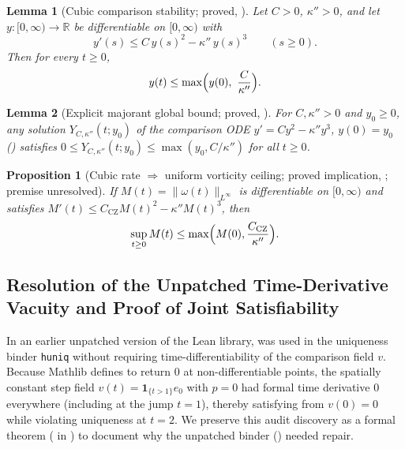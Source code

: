 \documentclass[11pt,a4paper]{article}
\theoremstyle{plain}
\newtheorem{proposition}{Proposition}[section]
\newtheorem{lemma}{Lemma}[section]
\theoremstyle{definition}
\theoremstyle{remark}
\newcommand{\R}{\mathbb{R}}
\newcommand{\CZ}{C_{\mathrm{CZ}}}
\begin{document}
\begin{lemma}[Cubic comparison stability; proved, ]\label{lem:cubic}
Let $C>0$, $\kappa''>0$, and let $y:[0,\infty)\to\R$ be differentiable on $[0,\infty)$ with
\[
y'(s)\le C\,y(s)^2-\kappa''\,y(s)^3\qquad(s\ge0).
\]
Then for every $t\ge0$,
\[
y(t)\le\max\Bigl(y(0),\ \frac{C}{\kappa''}\Bigr).
\]
\end{lemma}

\begin{lemma}[Explicit majorant global bound; proved, ]\label{lem:majorant}
For $C,\kappa''>0$ and $y_0\ge0$, any solution $Y_{C,\kappa''}(t;y_0)$ of the comparison ODE $y'=Cy^2-\kappa''y^3$, $y(0)=y_0$ () satisfies $0\le Y_{C,\kappa''}(t;y_0)\le\max(y_0,C/\kappa'')$ for all $t\ge0$.
\end{lemma}

\begin{proposition}[Cubic rate $\Rightarrow$ uniform vorticity ceiling; proved implication, ; premise unresolved]\label{prop:ceiling}
If $M(t)=\|\omega(t)\|_{L^\infty}$ is differentiable on $[0,\infty)$ and satisfies $M'(t)\le \CZ M(t)^2-\kappa''M(t)^3$, then
\[
\sup_{t\ge0}M(t)\le\max\Bigl(M(0),\frac{\CZ}{\kappa''}\Bigr).
\]
\end{proposition}

\subsection{Resolution of the Unpatched Time-Derivative Vacuity and Proof of Joint Satisfiability}\label{sec:vacuity}
In an earlier unpatched version of the Lean library,  was used in the uniqueness binder \texttt{huniq} without requiring time-differentiability of the comparison field $v$. Because Mathlib defines  to return $0$ at non-differentiable points, the spatially constant step field $v(t)=\mathbf 1_{\{t>1\}}e_0$ with $p=0$ had formal time derivative $0$ everywhere (including at the jump $t=1$), thereby satisfying  from $v(0)=0$ while violating uniqueness at $t=2$. We preserve this audit discovery as a formal theorem ( in ) to document why the unpatched binder () needed repair.
\end{document}

